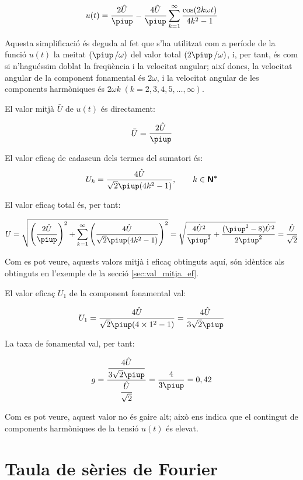 \begin{exemple}[\ValorMitjaEfTaxaFon{}]
    \[
    u(t) = \frac{2\hat{U}}{\piup} - \frac{4\hat{U}}{\piup} \sum_{k=1}^\infty
          \frac{\cos(2 k \omega t)}{4k^2-1}
    \]

    Aquesta simplificació és deguda al fet que s'ha utilitzat com a
    període de la funció $u(t)$ la meitat $(\piup\,/\omega)$ del valor total
    $(2\piup\,/\omega)$, i, per tant, és com si n'haguéssim doblat la
    freqüència i la velocitat angular; així doncs, la velocitat angular
    de la component fonamental és $2\omega$, i la velocitat angular de
    les components harmòniques és $2\omega k \;(k=2,3,4,5,\ldots,\infty)$.

    El valor mitjà $\bar{U}$ de $u(t)$ és directament:

    \[
        \bar{U} = \frac{2\hat{U}}{\piup}
    \]

    El valor eficaç de cadascun dels termes del sumatori és:
    \[
        U_k =\frac{4\hat{U}}{\sqrt{2}\piup(4k^2-1)},
        \qquad k \in \mathsfb{N^*}
    \]

    El valor eficaç total és, per tant:

    \[
        U=\sqrt{\left(\frac{2\hat{U}}{\piup}\right)^2 + \sum_{k=1}^\infty
        \left(\frac{4\hat{U}}{\sqrt{2}\piup(4k^2-1)}\right)^2} =
        \sqrt{\frac{4\hat{U}^2}{\piup^2} + \frac{(\piup^2-8)\hat{U}^2}{2\piup^2}
        }= \frac{\hat{U}}{\sqrt{2}}
    \]

    Com es pot veure, aquests valors mitjà i eficaç obtinguts aquí, són
    idèntics als obtinguts en l'exemple de la secció
    \ref{sec:val_mitja_ef}.

    El valor eficaç $U_1$ de la component fonamental val:

    \[
        U_1 =\frac{4\hat{U}}{\sqrt{2}\piup(4\times 1^2-1)} =
        \frac{4\hat{U}}{3\sqrt{2}\piup}
    \]

    La taxa de fonamental val, per tant:

    \[
        g =
        \frac{\dfrac{4\hat{U}}{3\sqrt{2}\piup}}{\dfrac{\hat{U}}{\sqrt{2}}}
        =\frac{4}{3\piup} = 0,{42}
    \]

    Com es pot veure, aquest valor no és gaire alt; això ens indica que
    el contingut de components harmòniques de la tensió $u(t)$ és
    elevat.
\end{exemple}


\section{Taula de sèries de Fourier}

